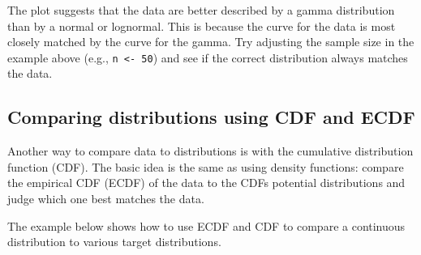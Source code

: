 \documentclass[
  13,
  letterpaper,
]{report}
\begin{document}
The plot suggests that the data are better described by a gamma
distribution than by a normal or lognormal. This is because the curve
for the data is most closely matched by the curve for the gamma. Try
adjusting the sample size in the example above (e.g.,
\texttt{n\ \textless{}-\ 50}) and see if the correct distribution always
matches the data.

\subsection{Comparing distributions using CDF and
ECDF}\label{sec-dtest-fit-cdf}

Another way to compare data to distributions is with the cumulative
distribution function (CDF). The basic idea is the same as using density
functions: compare the empirical CDF (ECDF) of the data to the CDFs
potential distributions and judge which one best matches the data.

The example below shows how to use ECDF and CDF to compare a continuous
distribution to various target distributions.
\end{document}
